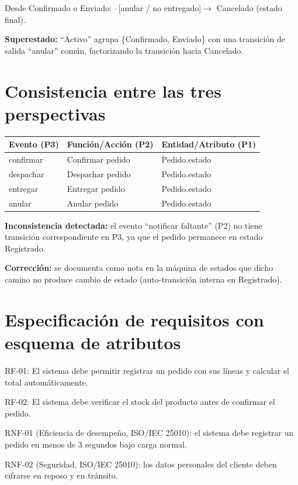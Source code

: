 \documentclass[11pt]{article}
\begin{document}
Desde Confirmado o Enviado: --[anular / no entregado]$\rightarrow$ Cancelado (estado final).

\textbf{Superestado:} ``Activo'' agrupa \{Confirmado, Enviado\} con una transición de salida ``anular'' común, factorizando la transición hacia Cancelado.

\section{Consistencia entre las tres perspectivas}

\begin{center}
\small
\begin{tabular}{p{3.2cm}p{5cm}p{4.5cm}}
\toprule
\textbf{Evento (P3)} & \textbf{Función/Acción (P2)} & \textbf{Entidad/Atributo (P1)} \\
\midrule
confirmar & Confirmar pedido & Pedido.estado \\
despachar & Despachar pedido & Pedido.estado \\
entregar & Entregar pedido & Pedido.estado \\
anular & Anular pedido & Pedido.estado \\
\bottomrule
\end{tabular}
\end{center}

\textbf{Inconsistencia detectada:} el evento ``notificar faltante'' (P2) no tiene transición correspondiente en P3, ya que el pedido permanece en estado Registrado.

\textbf{Corrección:} se documenta como nota en la máquina de estados que dicho camino no produce cambio de estado (auto-transición interna en Registrado).

\section{Especificación de requisitos con esquema de atributos}

RF-01: El sistema debe permitir registrar un pedido con sus líneas y calcular el total automáticamente.

RF-02: El sistema debe verificar el stock del producto antes de confirmar el pedido.

RNF-01 (Eficiencia de desempeño, ISO/IEC 25010): el sistema debe registrar un pedido en menos de 3 segundos bajo carga normal.

RNF-02 (Seguridad, ISO/IEC 25010): los datos personales del cliente deben cifrarse en reposo y en tránsito.
\end{document}
